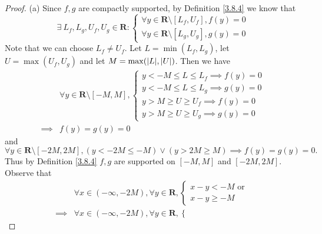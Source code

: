 \begin{proof}{(a)}
    Since \(f, g\) are compactly supported, by Definition \ref{3.8.4} we know that
    \[
        \exists\ L_f, L_g, U_f, U_g \in \mathbf{R} : \begin{cases}
            \forall y \in \mathbf{R} \setminus [L_f, U_f], f(y) = 0 \\
            \forall y \in \mathbf{R} \setminus [L_g, U_g], g(y) = 0
        \end{cases}
    \]
    Note that we can choose \(L_f \neq U_f\).
    Let \(L = \min(L_f, L_g)\), let \(U = \max(U_f, U_g)\) and let \(M = \max(\abs*{L}, \abs*{U})\).
    Then we have
    \begin{align*}
                 & \forall y \in \mathbf{R} \setminus [-M, M], \begin{cases}
                                                                   y < -M \leq L \leq L_f \implies f(y) = 0 \\
                                                                   y < -M \leq L \leq L_g \implies g(y) = 0 \\
                                                                   y > M \geq U \geq U_f \implies f(y) = 0  \\
                                                                   y > M \geq U \geq U_g \implies g(y) = 0
                                                               \end{cases} \\
        \implies & f(y) = g(y) = 0
    \end{align*}
    and
    \[
        \forall y \in \mathbf{R} \setminus [-2M, 2M], (y < -2M \leq -M) \lor (y > 2M \geq M) \implies f(y) = g(y) = 0.
    \]
    Thus by Definition \ref{3.8.4} \(f, g\) are supported on \([-M, M]\) and \([-2M, 2M]\).
    Observe that
    \begin{align*}
                 & \forall x \in (-\infty, -2M), \forall y \in \mathbf{R}, \begin{cases}
                                                                               x - y < -M \text{ or } \\
                                                                               x - y \geq -M
                                                                           \end{cases}                      \\
        \implies & \forall x \in (-\infty, -2M), \forall y \in \mathbf{R}, \begin{cases}

\end{cases}
\end{align*}
\end{proof}
